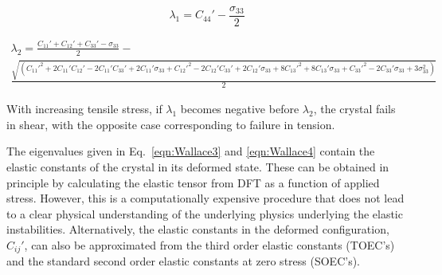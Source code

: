 \documentclass[showpacs,aps,floatfix,prb,reprint,superscriptaddress]{revtex4-1}
\begin{document}
\begin{equation}
\label{eqn:Wallace3} 
\lambda_{1} = C_{44}' - \frac{\sigma_{33}}{2} 
\end{equation}
\begin{widetext}
\begin{multline}
\label{eqn:Wallace4}
\lambda_{2} =  \frac{C_{11}' + C_{12}' + C_{33}' - \sigma_{33}}{2} - \\ \frac{\sqrt{(C_{11}'^2 + 2C_{11}'C_{12}' - 2C_{11}'C_{33}' + 2C_{11}'\sigma_{33} +  C_{12}'^2 - 2C_{12}'C_{33}' + 2C_{12}'\sigma_{33} + 8C_{13}'^2 + 8C_{13}'\sigma_{33} + C_{33}'^2 - 2C_{33}'\sigma_{33} + 3\sigma_{33}^2)}}{2}
\end{multline}
\end{widetext}
With increasing tensile stress, if $\lambda_{1}$ becomes negative before $\lambda_{2}$, the crystal fails in shear, with the opposite case corresponding to failure in tension.

The eigenvalues given in Eq.~\ref{eqn:Wallace3} and \ref{eqn:Wallace4} contain the elastic constants of the crystal in its deformed state. These can be obtained in principle by calculating the elastic tensor from DFT as a function of applied stress. However, this is a computationally expensive procedure that does not lead to a clear physical understanding of the underlying physics underlying the elastic instabilities. Alternatively, the elastic constants in the deformed configuration, $C_{ij}'$, can also be approximated from the third order elastic constants (TOEC's) and the standard second order elastic constants at zero stress (SOEC's).
\end{document}

